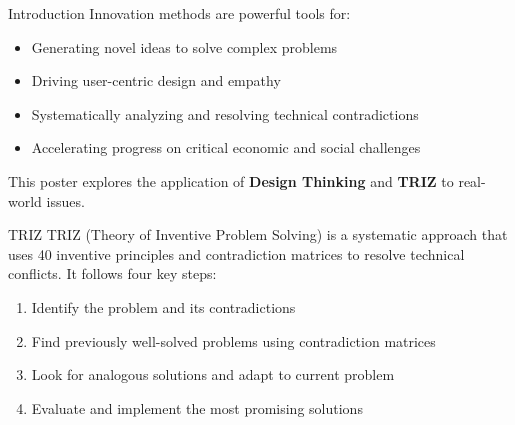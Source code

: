\documentclass[final]{beamer}
\begin{document}
\begin{frame}{}
\begin{columns}[t]
\begin{column}{.35\linewidth}
\begin{block}{}
				\vspace{0.85cm}
				
				\tiny \textit{\insertinstitute}
				
				\vspace{1cm}

			\end{block}
			\vspace{1cm}

			\begin{block}{Introduction}
				Innovation methods are powerful tools for:
				\begin{itemize}
					\item Generating novel ideas to solve complex problems
					\item Driving user-centric design and empathy
					\item Systematically analyzing and resolving technical contradictions
					\item Accelerating progress on critical economic and social challenges
				\end{itemize}
				This poster explores the application of \textbf{Design Thinking} and \textbf{TRIZ} to real-world issues.
			\end{block}
			\vspace{1cm}
			\begin{block}{TRIZ}
				TRIZ (Theory of Inventive Problem Solving) is a systematic approach that uses 40 inventive principles and contradiction matrices to resolve technical conflicts. It follows four key steps:
				\begin{enumerate}
					\item Identify the problem and its contradictions
					\item Find previously well-solved problems using contradiction matrices
					\item Look for analogous solutions and adapt to current problem
					\item Evaluate and implement the most promising solutions
				\end{enumerate}
				\vspace{1cm}


\end{block}
\end{column}
\end{columns}
\end{frame}
\end{document}
